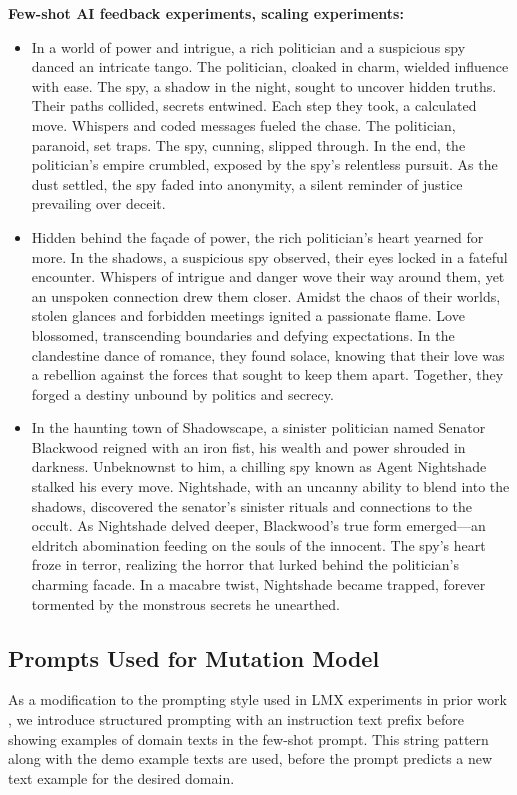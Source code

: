 \textbf{Few-shot AI feedback experiments, scaling experiments:}
\begin{itemize}
    \item In a world of power and intrigue, a rich politician and a suspicious spy danced an intricate tango. The politician, cloaked in charm, wielded influence with ease. The spy, a shadow in the night, sought to uncover hidden truths. Their paths collided, secrets entwined. Each step they took, a calculated move. Whispers and coded messages fueled the chase. The politician, paranoid, set traps. The spy, cunning, slipped through. In the end, the politician's empire crumbled, exposed by the spy's relentless pursuit. As the dust settled, the spy faded into anonymity, a silent reminder of justice prevailing over deceit.
    \item Hidden behind the façade of power, the rich politician's heart yearned for more. In the shadows, a suspicious spy observed, their eyes locked in a fateful encounter. Whispers of intrigue and danger wove their way around them, yet an unspoken connection drew them closer. Amidst the chaos of their worlds, stolen glances and forbidden meetings ignited a passionate flame. Love blossomed, transcending boundaries and defying expectations. In the clandestine dance of romance, they found solace, knowing that their love was a rebellion against the forces that sought to keep them apart. Together, they forged a destiny unbound by politics and secrecy.
    \item In the haunting town of Shadowscape, a sinister politician named Senator Blackwood reigned with an iron fist, his wealth and power shrouded in darkness. Unbeknownst to him, a chilling spy known as Agent Nightshade stalked his every move. Nightshade, with an uncanny ability to blend into the shadows, discovered the senator's sinister rituals and connections to the occult. As Nightshade delved deeper, Blackwood's true form emerged—an eldritch abomination feeding on the souls of the innocent. The spy's heart froze in terror, realizing the horror that lurked behind the politician's charming facade. In a macabre twist, Nightshade became trapped, forever tormented by the monstrous secrets he unearthed.
\end{itemize}

\subsection{Prompts Used for Mutation Model}\label{app:lmx_prompts}
As a modification to the prompting style used in LMX experiments in prior work \cite{meyerson2023language}, we introduce structured prompting with an instruction text prefix before showing examples of domain texts in the few-shot prompt. This string pattern along with the demo example texts are used, before the prompt predicts a new text example for the desired domain.

